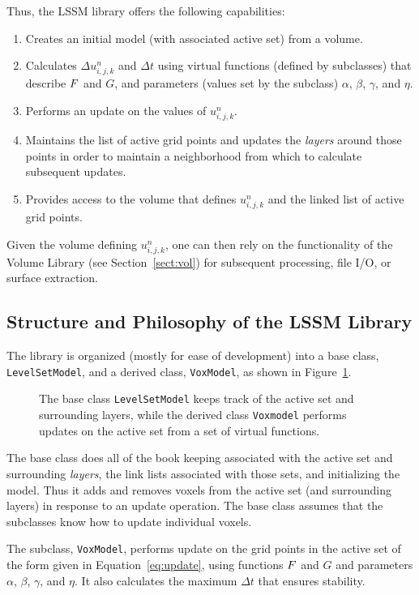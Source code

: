 Thus, the LSSM library offers the following capabilities:
\begin{enumerate}
\item Creates an initial model (with associated active set) from a
volume.
\item Calculates $\Delta u^{n}_{i, j, k}$ and  $\Delta t$ using
virtual functions (defined by subclasses) that describe ${\boldmath F}$ and
$G$, and parameters (values set by the subclass) $\alpha$, $\beta$,
$\gamma$, and $\eta$.
\item Performs an update on the values of $u^{n}_{i, j, k}$.
\item Maintains the list of active grid points and updates the {\em
layers} around those points in order to maintain a neighborhood from
which to calculate subsequent updates.
\item Provides access to the volume that defines $u^{n}_{i, j, k}$ and
the linked list of active grid points.
\end{enumerate}
Given the volume defining $u^{n}_{i, j, k}$, one can then rely on the
functionality of the Volume Library (see Section~\ref{sect:vol})
for subsequent processing, file I/O, or surface extraction.

\subsection{Structure and Philosophy of the LSSM Library}
The library is organized (mostly for ease of development) into a base
class, {\tt LevelSetModel}, and a derived class, {\tt VoxModel}, as
shown in Figure~\ref{fig:voxmodel}.
\begin{figure}
\caption{The base class {\tt LevelSetModel} keeps track of the active
set and surrounding layers, while the derived class {\tt Voxmodel}
performs updates on the active set from a set of virtual functions.}
\protect\label{fig:voxmodel}
\end{figure}
The
base class does all of the book keeping associated with the active set
and surrounding {\em layers}, the link lists associated with those
sets, and initializing the model.  Thus it adds and removes voxels
from the active set (and surrounding layers) in response to an update
operation.  The base class assumes that the subclasses know how to
update individual voxels.

The subclass, {\tt VoxModel}, performs update on the grid points in
the active set of the form given in Equation~\ref{eq:update}, using
functions ${\boldmath F}$ and $G$ and parameters $\alpha$, $\beta$, $\gamma$,
and $\eta$.  It also calculates the maximum $\Delta t$ that ensures
stability.

